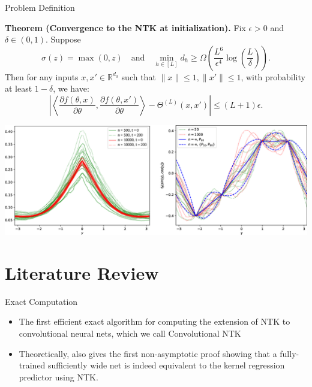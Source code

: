 \documentclass[serif, aspectratio=169]{beamer}
\begin{document}
 \begin{frame}{Problem Definition}
 	
 \textbf{Theorem (Convergence to the NTK at initialization).} Fix $\epsilon > 0$ and $\delta \in (0,1)$. Suppose 
 \[
 \sigma(z) = \max(0, z) \quad \text{and} \quad \min_{h \in [L]} d_h \geq \Omega\left(\frac{L^6}{\epsilon^4} \log\left(\frac{L}{\delta}\right)\right).
 \]
 Then for any inputs $x, x' \in \mathbb{R}^{d_0}$ such that $\|x\| \leq 1, \|x'\| \leq 1$, with probability at least $1 - \delta$, we have:
 \[
 \left| \left\langle \frac{\partial f(\theta, x)}{\partial \theta}, \frac{\partial f(\theta, x')}{\partial \theta} \right\rangle - \Theta^{(L)}(x, x') \right| \leq (L + 1)\epsilon.
 \]
 \end{frame}
 
 \begin{frame}
  \centering %
 \includegraphics[width=\textwidth]{pic/NTK_paper_exp.png} %
  \end{frame}
 
 
 
 
 
\section{Literature Review}

\begin{frame}{Exact Computation}
\begin{itemize}
	\item The first efficient exact algorithm for computing the extension of NTK to convolutional neural nets, which we call Convolutional NTK
	\item Theoretically, also
	gives the first non-asymptotic proof showing that a fully-trained sufficiently wide net is indeed equivalent to the kernel regression predictor using NTK.
\end{itemize}
\end{frame}
\end{document}
